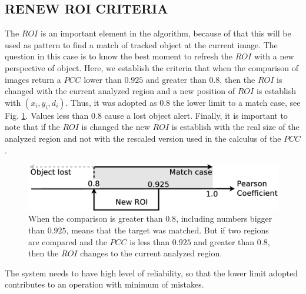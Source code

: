\subsection{RENEW ROI CRITERIA}
The $ROI$ is an important element in the algorithm, because of that this  
will be used as pattern to find a match of tracked object at the current image. 
The  question in this case is to know the best moment to refresh the $ROI$
with a new perspective of object. 
Here, we establish the criteria that when the comparison of images return 
a $PCC$ lower than $0.925$ and greater than $0.8$, then the $ROI$ is changed with the current 
analyzed region and a new position of $ROI$ is establish with $(x_i,y_i,d_i)$. 
Thus, it was adopted as $0.8$ the lower limit to a match case\cite{Eugene},
see Fig. \ref{fig:newroicri}. Values less than $0.8$ cause a  lost object alert.
Finally, it is important to note that if the $ROI$ is changed the new $ROI$ is establish
with the real size of the analyzed region and not with the rescaled version used
in the calculus of the $PCC$.


\begin{figure}[H]
\includegraphics[width=\columnwidth]{images/figure3.eps}
\caption{When the comparison is greater than $0.8$, including numbers bigger than 
$0.925$, means that the target was matched. But if two regions are compared 
and the $PCC$ is less than $0.925$ and greater than $0.8$, 
then the $ROI$ changes to the current analyzed region.}
\label{fig:newroicri}
\end{figure}

The system needs to have high level of reliability, so that the lower limit adopted 
contributes to an operation with minimum of mistakes.
